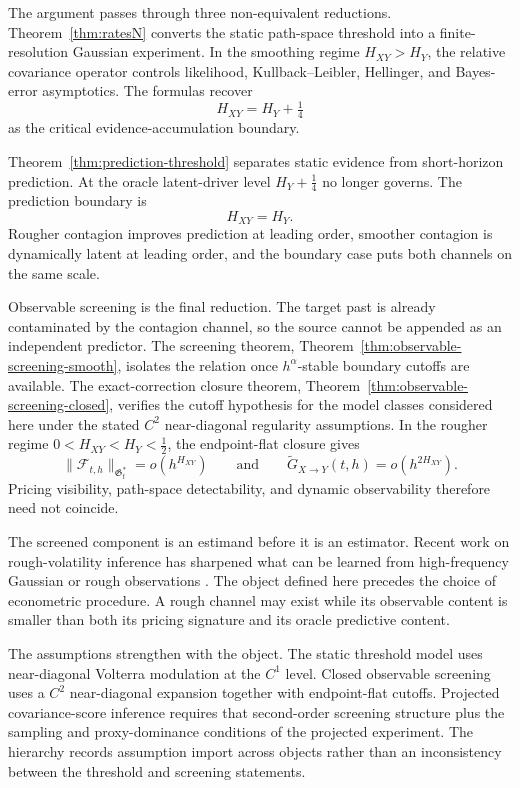 \documentclass[11pt,a4paper]{amsart}
\theoremstyle{plain}
\theoremstyle{definition}
\theoremstyle{remark}
\begin{document}
The argument passes through three non-equivalent reductions.  Theorem~\ref{thm:ratesN} converts
the static path-space threshold into a finite-resolution Gaussian experiment.  In the smoothing
regime \(H_{XY}>H_Y\), the relative covariance operator controls likelihood,
Kullback--Leibler, Hellinger, and Bayes-error asymptotics.  The formulas recover
\[
H_{XY}=H_Y+\tfrac14
\]
as the critical evidence-accumulation boundary.

Theorem~\ref{thm:prediction-threshold} separates static evidence from short-horizon prediction.
At the oracle latent-driver level \(H_Y+\tfrac14\) no longer governs.  The prediction boundary is
\[
H_{XY}=H_Y.
\]
Rougher contagion improves prediction at leading order, smoother contagion is dynamically latent at
leading order, and the boundary case puts both channels on the same scale.

Observable screening is the final reduction.  The target past is already contaminated by the
contagion channel, so the source cannot be appended as an independent predictor.  The screening
theorem, Theorem~\ref{thm:observable-screening-smooth}, isolates the relation once
\(h^\alpha\)-stable boundary cutoffs are available.  The exact-correction closure theorem,
Theorem~\ref{thm:observable-screening-closed}, verifies the cutoff hypothesis for the model
classes considered here under the stated \(C^2\) near-diagonal regularity assumptions.  In the
rougher regime \(0<H_{XY}<H_Y<\tfrac12\), the endpoint-flat closure gives
\[
\|\mathcal F_{t,h}\|_{\mathfrak G_t^*}=o(h^{H_{XY}})
\qquad\text{and}\qquad
\widetilde G_{X\to Y}(t,h)=o(h^{2H_{XY}}).
\]
Pricing visibility, path-space detectability, and dynamic observability therefore need not
coincide.

The screened component is an estimand before it is an estimator.  Recent work on rough-volatility
inference has sharpened what can be learned from high-frequency Gaussian or rough observations
\cite{BF18,CHLRS24,CD24}.  The object defined here precedes the choice of econometric procedure.  A
rough channel may exist while its observable content is smaller than both its pricing signature and
its oracle predictive content.

The assumptions strengthen with the object.  The static threshold model uses near-diagonal Volterra
modulation at the \(C^1\) level.  Closed observable screening uses a \(C^2\) near-diagonal expansion
together with endpoint-flat cutoffs.  Projected covariance-score inference requires that
second-order screening structure plus the sampling and proxy-dominance conditions of the projected
experiment.  The hierarchy records assumption import across objects rather than an inconsistency between
the threshold and screening statements.
\end{document}
